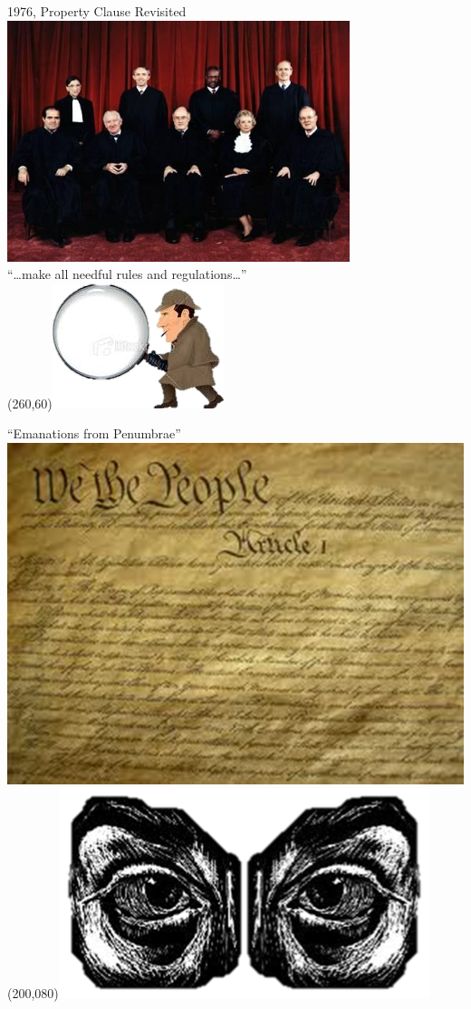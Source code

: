 \begin{frame}{1976, Property Clause Revisited}
    \centering
    \includegraphics[width=0.75\textwidth]{img/sc-1976.png} \\
    ``\ldots make all needful rules and regulations\ldots'' \\
    \Put(260,60){\includegraphics[width=.2\textwidth]{img/sherlock.png}}
\end{frame}

\begin{frame}{``Emanations from Penumbrae''}
   \centering
   \includegraphics[height=.7\textheight]{img/constitution.png} \\
   \Put(200,080){\includegraphics[width=.4\textwidth]{img/eyes.png}}
\end{frame}

